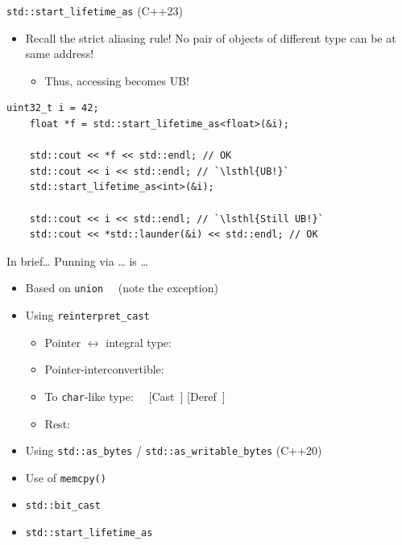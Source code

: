 \begin{frame}[fragile]{\texttt{std::start\_lifetime\_as} (C++23)}
  \begin{itemize}
  \item Recall the strict aliasing rule! No pair of objects of different type can be at same address!
    \begin{itemize}
    \item Thus, accessing  becomes UB!
    \end{itemize}
  \end{itemize}

  \pause
  \begin{lstlisting}[style=c++]
    uint32_t i = 42;
    float *f = std::start_lifetime_as<float>(&i);

    std::cout << *f << std::endl; // OK
    std::cout << i << std::endl; // `\lsthl{UB!}`
    std::start_lifetime_as<int>(&i);

    std::cout << i << std::endl; // `\lsthl{Still UB!}`
    std::cout << *std::launder(&i) << std::endl; // OK
  \end{lstlisting}
\end{frame}

\begin{frame}{In brief\ldots}
  Punning via \ldots{} is \ldots{}
  \begin{itemize}
  \item Based on \texttt{union} ~~\NotOK (note the exception)

  \item Using \texttt{reinterpret\_cast}
    \begin{itemize}
    \item Pointer $\leftrightarrow$ integral type: ~~\OK
    \item Pointer-interconvertible: ~~\OK
    \item To \texttt{char}-like type: ~~[Cast~\OK] [Deref~\question]
    \item \alert{Rest:} ~~\NotOK
    \end{itemize}

  \item Using \texttt{std::as\_bytes} / \texttt{std::as\_writable\_bytes} (C++20) ~~\OK~\question

  \item Use of \texttt{memcpy()} ~~\OK

  \item \texttt{std::bit\_cast} ~~\OK

  \item \texttt{std::start\_lifetime\_as} ~~\OK
  \end{itemize}
\end{frame}

